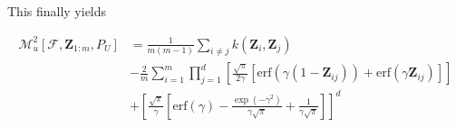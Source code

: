 \documentclass[10pt,a4paper]{article}
\begin{document}
This finally yields

\begin{equation}
\begin{aligned}
\mathcal{M}_u^2[\mathcal{F}, \boldsymbol{Z}_{1:m}, P_U]  &= \frac{1}{m(m-1)}\sum_{i\neq j}k(\boldsymbol{Z}_{i}, \boldsymbol{Z}_{j})\\
& - \frac{2}{m}\sum_{i=1}^{m}\prod_{j=1}^{d}\left[\frac{\sqrt{\pi}}{2\gamma}[\mathrm{erf}(\gamma(1 - \boldsymbol{Z}_{ij})) + \mathrm{erf}(\gamma\boldsymbol{Z}_{ij})]\right]\\
& + \left[\frac{\sqrt{\pi}}{\gamma}\left[\mathrm{erf}(\gamma) - \frac{\exp(-\gamma^2)}{\gamma\sqrt{\pi}} + \frac{1}{\gamma\sqrt{\pi}}\right]\right]^d
\end{aligned}
\end{equation}
\end{document}
